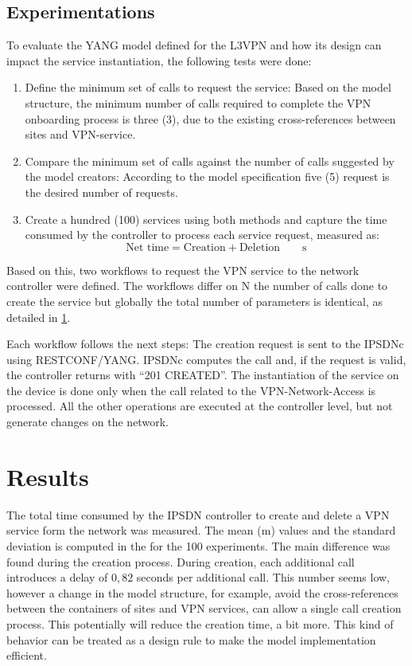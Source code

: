 \documentclass[conference]{IEEEtran}
\begin{document}
\subsection{Experimentations}
To evaluate the YANG model defined for the L3VPN and how its design can impact the service instantiation, the following tests were done:
\begin{enumerate}
    \item Define the minimum set of calls to request the service: Based on the model structure, the minimum number of calls required to complete the VPN onboarding process is three (3), due to the existing cross-references between sites and VPN-service.
    \item Compare the minimum set of calls against the number of calls suggested by the model creators: According to the model specification five (5) request is the desired number of requests. 
    \item Create a hundred (100) services using both methods and capture the time consumed by the controller to process each service request, measured as:
    \begin{equation}
         \si{\textrm{Net time}= \textrm{Creation} + \textrm{Deletion}\qquad \second}
    \end{equation}
\end{enumerate}

Based on this, two workflows to request the VPN service to the network controller were defined. The workflows differ on N the number of calls done to create the service but globally the total number of parameters is identical, as detailed in \ref{}.

Each workflow follows the next steps:  The creation request is sent to the IPSDNc using RESTCONF/YANG. IPSDNc computes the call and, if the request is valid, the controller returns with “201 CREATED”. The instantiation of the service on the device is done only when the call related to the VPN-Network-Access is processed. All the other operations are executed at the controller level, but not generate changes on the network. 

\section{Results}
The total time consumed by the IPSDN controller to create and delete a VPN service form the network was measured. The mean (m) values and the standard deviation is computed in the for the 100 experiments. The main difference was found during the creation process. During creation, each additional call introduces a delay of $0,82$ seconds per additional call. This number seems low, however a change in the model structure, for example, avoid the cross-references between the containers of sites and VPN services, can allow a single call creation process. This potentially will reduce the creation time, a bit more. This kind of behavior can be treated as a design rule to make the model implementation efficient. 
\end{document}
